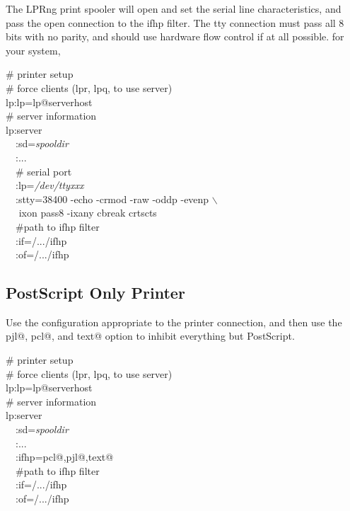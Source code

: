 \documentclass[a4paper]{article}
\begin{document}
The LPRng print spooler will open and set the serial
line characteristics,
and pass the open connection to the
{\ttfamily ifhp} filter.
The 
{\ttfamily tty} connection must pass all 8 bits with no parity,
and should use hardware flow control if at all possible.
for your system,
\begin{tscreen}
\# printer setup  \\ 
\#  force clients (lpr, lpq, to use server)  \\ 
lp:lp=lp@serverhost  \\ 
\# server information  \\ 
lp:server  \\ 
~~:sd={\itshape spooldir\/}  \\ 
~~:...  \\ 
~~\# serial port \\ 
~~:lp={\itshape /dev/ttyxxx\/} \\ 
~~:stty=38400 -echo -crmod -raw -oddp -evenp $\backslash$ \\ 
~~   ixon pass8 -ixany cbreak crtscts \\ 
~~\#path to ifhp filter  \\ 
~~:if=/.../ifhp  \\ 
~~:of=/.../ifhp  
\end{tscreen}



\subsection{PostScript Only Printer}

Use the configuration appropriate to the printer connection,
and then use the
{\ttfamily pjl@}, {\ttfamily pcl@}, and {\ttfamily text@}
option to inhibit everything but PostScript.
\begin{tscreen}
\# printer setup  \\ 
\#  force clients (lpr, lpq, to use server)\\ 
lp:lp=lp@serverhost \\ 
\# server information  \\ 
lp:server  \\ 
~~:sd={\itshape spooldir\/} \\ 
~~:...  \\ 
~~:ifhp=pcl@,pjl@,text@ \\ 
~~\#path to ifhp filter  \\ 
~~:if=/.../ifhp  \\ 
~~:of=/.../ifhp  
\end{tscreen}
\end{document}
